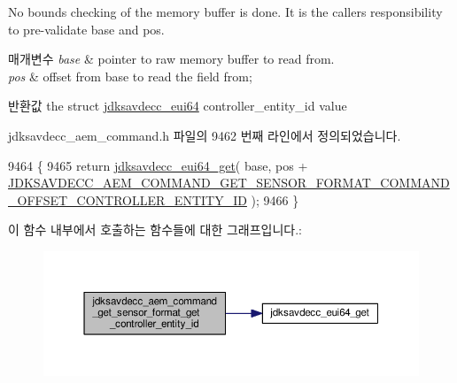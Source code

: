 No bounds checking of the memory buffer is done. It is the caller\textquotesingle{}s responsibility to pre-\/validate base and pos.


\begin{DoxyParams}{매개변수}
{\em base} & pointer to raw memory buffer to read from. \\
\hline
{\em pos} & offset from base to read the field from; \\
\hline
\end{DoxyParams}
\begin{DoxyReturn}{반환값}
the struct \hyperlink{structjdksavdecc__eui64}{jdksavdecc\+\_\+eui64} controller\+\_\+entity\+\_\+id value 
\end{DoxyReturn}


jdksavdecc\+\_\+aem\+\_\+command.\+h 파일의 9462 번째 라인에서 정의되었습니다.


\begin{DoxyCode}
9464 \{
9465     \textcolor{keywordflow}{return} \hyperlink{group__eui64_ga2652311a25a6b91cddbed75c108c7031}{jdksavdecc\_eui64\_get}( base, pos + 
      \hyperlink{group__command__get__sensor__format_ga3ed734bd1f12c7532e522d581e5ccf99}{JDKSAVDECC\_AEM\_COMMAND\_GET\_SENSOR\_FORMAT\_COMMAND\_OFFSET\_CONTROLLER\_ENTITY\_ID}
       );
9466 \}
\end{DoxyCode}


이 함수 내부에서 호출하는 함수들에 대한 그래프입니다.\+:
\nopagebreak
\begin{figure}[H]
\begin{center}
\leavevmode
\includegraphics[width=350pt]{group__command__get__sensor__format_gaaec1dd202801841b55607f599169cb3d_cgraph}
\end{center}
\end{figure}


